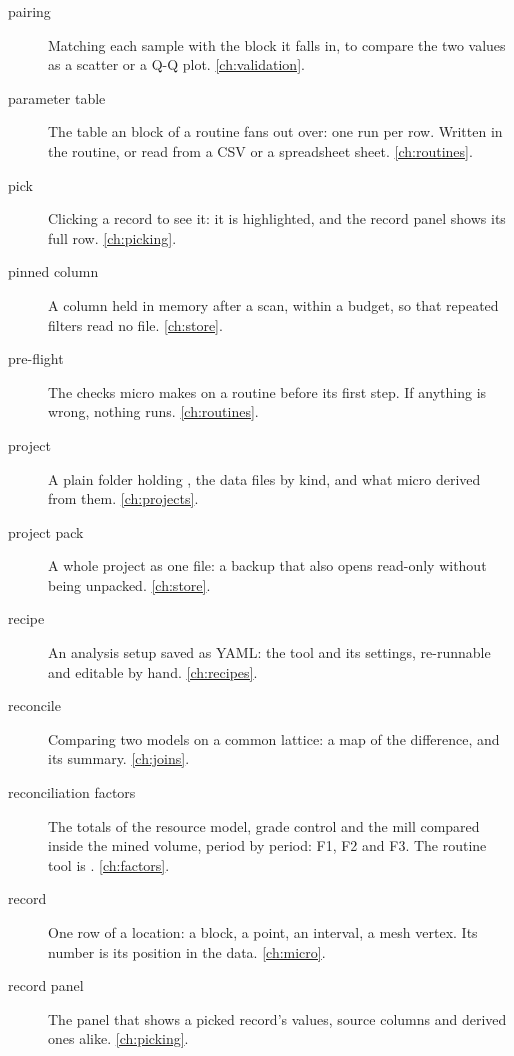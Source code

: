 \begin{description}
\item[pairing] Matching each sample with the block it falls in, to compare the two values as a
  scatter or a Q-Q plot. \cref{ch:validation}.

\item[parameter table] The table an  block of a routine fans out over: one run per row.
  Written in the routine, or read from a CSV or a spreadsheet sheet. \cref{ch:routines}.

\item[pick] Clicking a record to see it: it is highlighted, and the record panel shows its full
  row. \cref{ch:picking}.

\item[pinned column] A column held in memory after a scan, within a budget, so that repeated
  filters read no file. \cref{ch:store}.

\item[pre-flight] The checks micro makes on a routine before its first step. If anything is wrong,
  nothing runs. \cref{ch:routines}.

\item[project] A plain folder holding , the data files by kind, and what micro
  derived from them. \cref{ch:projects}.

\item[project pack] A whole project as one  file: a backup that also opens
  read-only without being unpacked. \cref{ch:store}.

\item[recipe] An analysis setup saved as YAML: the tool and its settings, re-runnable and editable
  by hand. \cref{ch:recipes}.

\item[reconcile] Comparing two models on a common lattice: a map of the difference, and its
  summary. \cref{ch:joins}.

\item[reconciliation factors] The totals of the resource model, grade control and the mill
  compared inside the mined volume, period by period: F1, F2 and F3. The routine tool is
  . \cref{ch:factors}.

\item[record] One row of a location: a block, a point, an interval, a mesh vertex. Its number is
  its position in the data. \cref{ch:micro}.

\item[record panel] The panel that shows a picked record's values, source columns and derived ones
  alike. \cref{ch:picking}.


\end{description}
